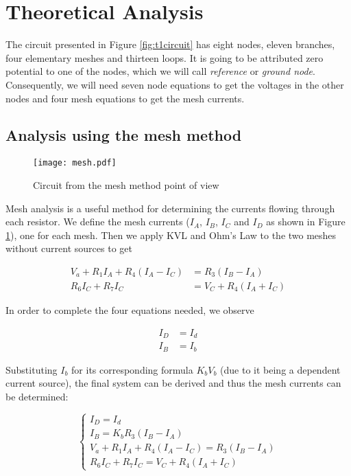 \section{Theoretical Analysis}
\label{sec:analysis}
The circuit presented in Figure \ref{fig:t1circuit} has eight nodes, eleven branches, four elementary meshes and thirteen loops. It is going to be attributed zero potential to one of the nodes, which we will call  \textit{reference} or \textit{ground node}.
Consequently, we will need seven node equations to get the voltages in the other nodes and four mesh equations to get the mesh currents. 
\subsection{Analysis using the mesh method}
\begin{figure}[!htp] \centering
\texttt{[image: mesh.pdf]}
\caption{Circuit from the mesh method point of view}
\label{fig2}
\end{figure}
\FloatBarrier

Mesh analysis is a useful method for determining the currents flowing through each resistor. We define the mesh currents ($I_A$, $I_B$, $I_C$ and $I_D$ as shown in Figure \ref{fig2}), one for each mesh. Then we apply KVL and Ohm's Law to the two meshes without current sources to get

\begin{align*}
V_a + R_1 I_A + R_4 (I_A - I_C) &= R_3 (I_B - I_A) \\
R_6 I_C + R_7 I_C &= V_C + R_4 (I_A + I_C)
\end{align*}

In order to complete the four equations needed, we observe

\begin{align*}
I_D &= I_d \\ 
I_B &= I_b
\end{align*}

Substituting $I_b$ for its corresponding formula $K_b V_b$ (due to it being a dependent current source), the final system can be derived and thus the mesh currents can be determined:

$$
\begin{cases} 
I_D = I_d  \\ 
I_B = K_b R_3 (I_B-I_A) \\
V_a + R_1 I_A + R_4 (I_A - I_C) = R_3 (I_B - I_A) \\
R_6 I_C + R_7 I_C = V_C + R_4 (I_A + I_C)
\end{cases}
$$

